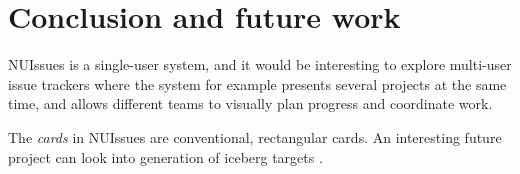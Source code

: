 \section{Conclusion and future work}


NUIssues is a single-user system, and it would be interesting to explore multi-user issue trackers where the system for example presents several projects at the same time, and allows different teams to visually plan progress and coordinate work.

The \textit{cards} in NUIssues are conventional, rectangular cards. An interesting future project can look into generation of iceberg targets \autocite[91]{wigdow-wixon:brave-nui-world:2011}.
